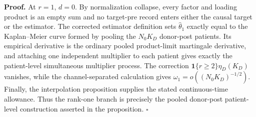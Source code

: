 \textbf{Proof.}
At \(r=1\), \(d=0\). By normalization collapse, every factor and loading product is an empty sum and no target-pre record enters either the causal target or the estimator. The corrected estimator definition sets \(\widehat\theta_1\) exactly equal to the Kaplan--Meier curve formed by pooling the \(N_0K_D\) donor-post patients. Its empirical derivative is the ordinary pooled product-limit martingale derivative, and attaching one independent multiplier to each patient gives exactly the patient-level simultaneous multiplier process. The correction \(\mathbf 1\{r\ge2\}\eta_D(K_D)\) vanishes, while the channel-separated calculation gives \(\omega_1=o((N_0K_D)^{-1/2})\). Finally, the interpolation proposition supplies the stated continuous-time allowance. Thus the rank-one branch is precisely the pooled donor-post patient-level construction asserted in the proposition. \(\square\)